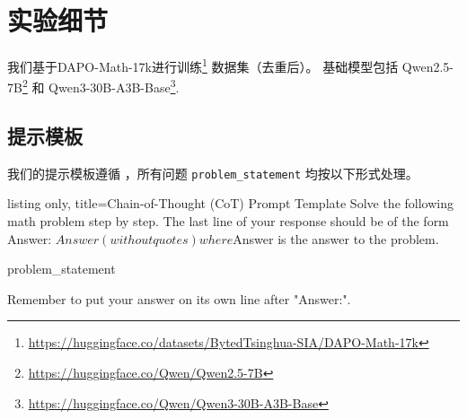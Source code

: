 \documentclass{article}
\theoremstyle{plain}
\theoremstyle{definition}
\theoremstyle{remark}
\begin{document}



\newpage
\appendix
\onecolumn

\section{实验细节}
\label{sec:appendix-experiment}
我们基于DAPO-Math-17k进行训练\footnote{\url{https://huggingface.co/datasets/BytedTsinghua-SIA/DAPO-Math-17k}} 数据集（去重后）。  
基础模型包括 Qwen2.5-7B\footnote{\url{https://huggingface.co/Qwen/Qwen2.5-7B}} 和 Qwen3-30B-A3B-Base\footnote{\url{https://huggingface.co/Qwen/Qwen3-30B-A3B-Base}}. 

\subsection{提示模板}
我们的提示模板遵循 \citet{yu2025dapo}，所有问题 \texttt{problem\_statement} 均按以下形式处理。 
\begin{tcblisting}{listing only, title=Chain-of-Thought (CoT) Prompt Template}
Solve the following math problem step by step. The last line of your response should be of the form Answer: $Answer (without quotes) where $Answer is the answer to the problem.

{problem_statement}

Remember to put your answer on its own line after "Answer:".
\end{tcblisting}
\end{document}
